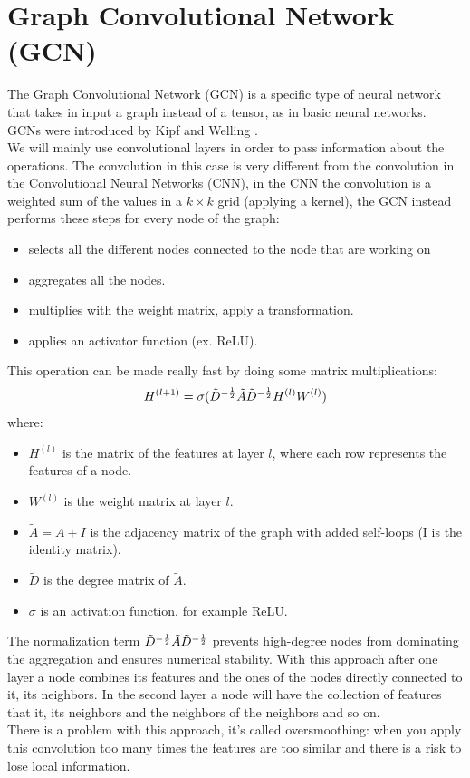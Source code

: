 \documentclass[12pt]{book}
\begin{document}
\section{Graph Convolutional Network (GCN)}
The Graph Convolutional Network (GCN) is a specific type of neural network that takes in input a graph instead of a tensor, as in basic neural networks. GCNs were introduced by Kipf and Welling \cite{kipf2017semi}.\\
We will mainly use convolutional layers in order to pass information about the operations. The convolution in this case is very different from the convolution in the Convolutional Neural Networks (CNN), in the CNN the convolution is a weighted sum of the values in a $k\times k$ grid (applying a kernel), the GCN instead performs these steps for every node of the graph:
\begin{itemize}
    \item selects all the different nodes connected to the node that are working on
    \item aggregates all the nodes.
    \item multiplies with the weight matrix, apply a transformation.
    \item applies an activator function (ex. ReLU).
\end{itemize}

This operation can be made really fast by doing some matrix multiplications:
$$H^{(l+1)}=\sigma(\tilde{D}^{-{1\over2}}\tilde{A}\tilde{D}^{-{1\over2}}H^{(l)}W^{(l)})$$
where:
\begin{itemize}
    \item $H^{(l)}$ is the matrix of the features at layer $l$, where each row represents the features of a node.
    \item $W^{(l)}$ is the weight matrix at layer $l$.
    \item $\tilde{A}=A+I$ is the adjacency matrix of the graph with added self-loops (I is the identity matrix).
    \item $\tilde{D}$ is the degree matrix of $\tilde{A}$.
    \item $\sigma$ is an activation function, for example ReLU.
\end{itemize}

The normalization term $\tilde{D}^{-{1\over2}}\tilde{A}\tilde{D}^{-{1\over2}}$ prevents high-degree nodes from dominating the aggregation and ensures numerical stability.
With this approach after one layer a node combines its features and the ones of the nodes directly connected to it, its neighbors. In the second layer a node will have the collection of features that it, its neighbors and the neighbors of the neighbors and so on.\\
There is a problem with this approach, it's called oversmoothing: when you apply this convolution too many times the features are too similar and there is a risk to lose local information.
\end{document}
